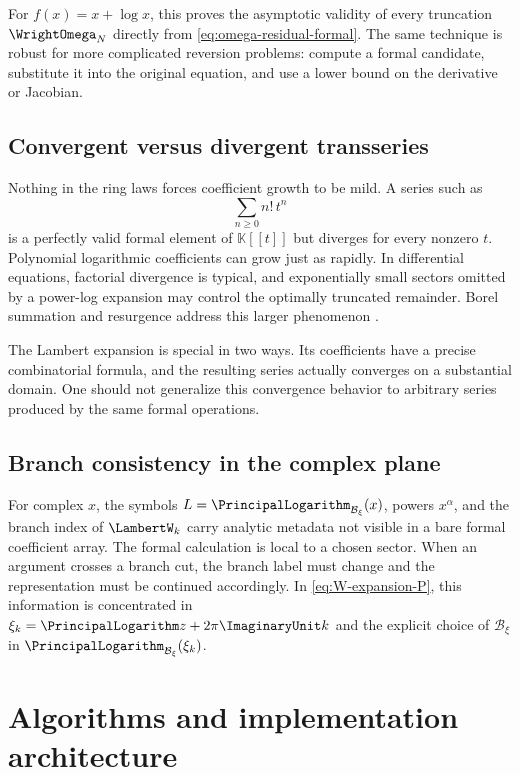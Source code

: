 \documentclass[11pt]{article}
\theoremstyle{pltheorem}
\newcommand{\K}{\mathbb K}
\newcommand{\LogarithmOnBranch}[2]{%
  \PrincipalLogarithm_{#1}\!\left(#2\right)%
}
\begin{document}
For \(f(x)=x+\log x\), this proves the asymptotic validity of every truncation \(\WrightOmega_N\) directly from
\cref{eq:omega-residual-formal}.  The same technique is robust for more complicated reversion problems: compute a formal candidate, substitute it into the original equation, and use a lower bound on the derivative or Jacobian.

\subsection{Convergent versus divergent transseries}

Nothing in the ring laws forces coefficient growth to be mild.  A series such as
\[
 \sum_{n\ge0}n!\,t^n
\]
is a perfectly valid formal element of \(\K[[t]]\) but diverges for every nonzero \(t\).  Polynomial logarithmic coefficients can grow just as rapidly.  In differential equations, factorial divergence is typical, and exponentially small sectors omitted by a power-log expansion may control the optimally truncated remainder.  Borel summation and resurgence address this larger phenomenon \cite{costin-book,ecalle}.

The Lambert expansion is special in two ways.  Its coefficients have a precise combinatorial formula, and the resulting series actually converges on a substantial domain.  One should not generalize this convergence behavior to arbitrary series produced by the same formal operations.

\subsection{Branch consistency in the complex plane}

For complex \(x\), the symbols
\(L=\LogarithmOnBranch{\mathcal B_\xi}{x}\), powers \(x^\alpha\), and the
branch index of \(\LambertW_k\) carry analytic metadata not visible in a bare formal
coefficient array.  The formal calculation is local to a chosen sector.  When
an argument crosses a branch cut, the branch label must change and the
representation must be continued accordingly.  In \cref{eq:W-expansion-P},
this information is concentrated in
\(\xi_k=\PrincipalLogarithm z+2\pi\ImaginaryUnit k\) and the explicit choice
of \(\mathcal B_\xi\) in
\(\LogarithmOnBranch{\mathcal B_\xi}{\xi_k}\).

\section{Algorithms and implementation architecture}
\label{sec:implementation}
\end{document}
